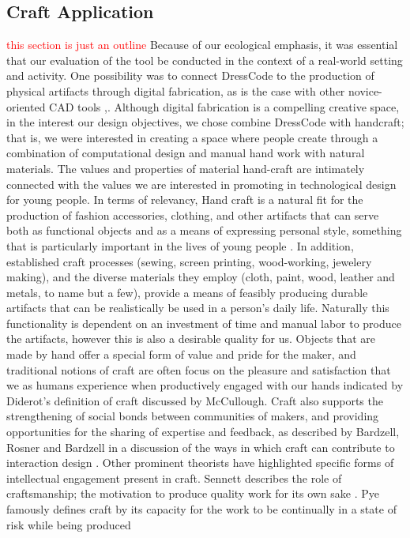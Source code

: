\documentclass{sigchi}
\begin{document}
\subsection{Craft Application}
\textcolor{red}{this section is just an outline}
Because of our ecological emphasis, it was essential that our evaluation of the tool be conducted in the context of a real-world setting and activity. One possibility was to connect DressCode to the production of physical artifacts through digital fabrication, as is the case with other novice-oriented CAD tools \cite{tinkercad},\cite{123D}. Although digital fabrication is a compelling creative space, in the interest our design objectives, we chose combine DressCode with handcraft; that is, we were interested in creating a space where people create through a combination of computational design and manual hand work with natural materials. The values and properties of material hand-craft are intimately connected with the values we are interested in promoting in technological design for young people. In terms of relevancy, Hand craft is a natural fit for the production of fashion accessories, clothing, and other artifacts that can serve both as functional objects and as a means of expressing personal style, something that is particularly important in the lives of young people \cite{lilypad}. In addition, established craft  processes (sewing, screen printing, wood-working, jewelery making), and the diverse materials they employ (cloth, paint, wood, leather and metals, to name but a few), provide a means of feasibly producing durable artifacts that can be realistically be used in a person's daily life. Naturally this functionality is dependent on an investment of time and manual labor to produce the artifacts, however this is also a desirable quality for us. Objects that are made by hand offer a special form of value and pride for the maker, and traditional notions of craft are often focus on the pleasure and satisfaction that we as humans experience when productively engaged with our hands indicated by Diderot's definition of craft discussed by McCullough\cite{abstracting_craft}. Craft also supports the strengthening of social bonds between communities of makers, and providing opportunities for the sharing of expertise and feedback, as described by Bardzell, Rosner and Bardzell in a discussion of the ways in which craft can contribute to interaction design \cite{bardzell}. Other prominent theorists have highlighted specific forms of intellectual engagement present in craft. Sennett describes the role of craftsmanship; the motivation to produce quality work for its own sake \cite{the_craftsman}. Pye famously defines craft by its capacity for the work to be continually in a state of risk while being produced 
\end{document}
